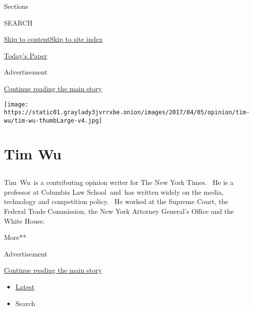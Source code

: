 Sections

SEARCH

\protect\hyperlink{site-content}{Skip to
content}\protect\hyperlink{site-index}{Skip to site index}

\href{https://myaccount.nytimes3xbfgragh.onion/auth/login?response_type=cookie\&client_id=vi}{}

\href{https://www.nytimes3xbfgragh.onion/section/todayspaper}{Today's
Paper}

Advertisement

\protect\hyperlink{after-top}{Continue reading the main story}

\texttt{[image: https://static01.graylady3jvrrxbe.onion/images/2017/04/05/opinion/tim-wu/tim-wu-thumbLarge-v4.jpg]}

\hypertarget{tim-wu}{%
\section{Tim Wu}\label{tim-wu}}

\subsection{}

Tim~Wu~is a contributing opinion writer for The New York Times.~ He is a
professor at Columbia Law School~and~has written widely on the media,
technology and competition policy.~ He worked at the Supreme Court, the
Federal Trade Commission, the New York Attorney General's Office and the
White House. ~~

More**

Advertisement

\protect\hyperlink{after-mid1}{Continue reading the main story}

\begin{itemize}
\tightlist
\item
  \protect\hyperlink{stream-panel}{Latest}
\item
  Search
\end{itemize}

